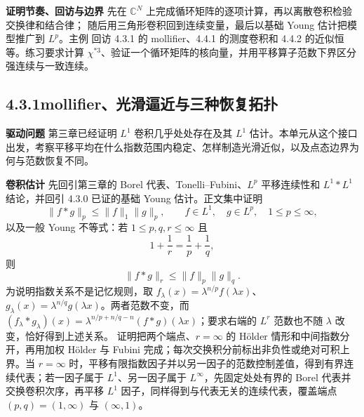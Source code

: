 \documentclass[11pt,a4paper]{ctexart}
\newcommand{\planitem}[1]{\par\smallskip\noindent\textcolor{deepblue}{\textbf{#1}}\quad}
\newcommand{\unithead}[2]{\subsection{#1\quad #2}}
\begin{document}
\planitem{证明节奏、回访与边界}
先在 $\mathbb C^N$ 上完成循环矩阵的逐项计算，再以离散卷积检验交换律和结合律；
随后用三角形卷积回到连续变量，最后以基础 Young 估计把模型推广到 $L^p$。主例
回访 4.3.1 的 mollifier、4.4.1 的测度卷积和 4.4.2 的近似恒等。练习要求计算
$\chi^{*3}$、验证一个循环矩阵的核向量，并用平移算子范数下界区分强连续与一致连续。

\unithead{4.3.1}{mollifier、光滑逼近与三种恢复拓扑}

\planitem{驱动问题}
第三章已经证明 $L^1$ 卷积几乎处处存在及其 $L^1$ 估计。本单元从这个接口出发，考察平移平均在什么指数范围内稳定、怎样制造光滑近似，以及点态边界为何与范数恢复不同。

\planitem{卷积估计}
先回引第三章的 Borel 代表、Tonelli--Fubini、$L^p$ 平移连续性和 $L^1*L^1$ 结论，并回引 4.3.0 已证的基础 Young 估计。正文集中证明
\[
\|f*g\|_p\le\|f\|_1\|g\|_p,
\qquad f\in L^1,\quad g\in L^p,\quad1\le p\le\infty,
\]
以及一般 Young 不等式：若 $1\le p,q,r\le\infty$ 且
\[
1+\frac1r=\frac1p+\frac1q,
\]
则
\[
\|f*g\|_r\le\|f\|_p\|g\|_q.
\]
为说明指数关系不是记忆规则，取 $f_\lambda(x)=\lambda^{n/p}f(\lambda x)$、
$g_\lambda(x)=\lambda^{n/q}g(\lambda x)$。两者范数不变，而
$(f_\lambda*g_\lambda)(x)=\lambda^{n/p+n/q-n}(f*g)(\lambda x)$；要求右端的
$L^r$ 范数也不随 $\lambda$ 改变，恰好得到上述关系。
证明把两个端点、$r=\infty$ 的 H\"older 情形和中间指数分开，再用加权 H\"older 与 Fubini 完成；每次交换积分前标出非负性或绝对可积上界。当 $r=\infty$ 时，平移有限指数因子并以另一因子的范数控制差值，得到有界连续代表；若一因子属于 $L^1$、另一因子属于 $L^\infty$，先固定处处有界的 Borel 代表并交换卷积次序，再平移 $L^1$ 因子，同样得到与代表无关的连续代表，覆盖端点 $(p,q)=(1,\infty)$ 与 $(\infty,1)$。
\end{document}
